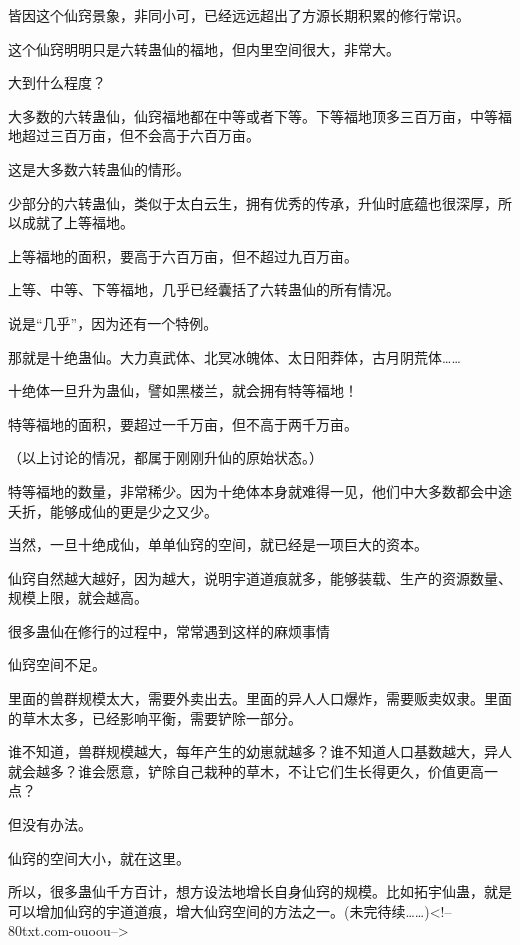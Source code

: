 \begin{this_body}
皆因这个仙窍景象，非同小可，已经远远超出了方源长期积累的修行常识。

这个仙窍明明只是六转蛊仙的福地，但内里空间很大，非常大。

大到什么程度？

大多数的六转蛊仙，仙窍福地都在中等或者下等。下等福地顶多三百万亩，中等福地超过三百万亩，但不会高于六百万亩。

这是大多数六转蛊仙的情形。

少部分的六转蛊仙，类似于太白云生，拥有优秀的传承，升仙时底蕴也很深厚，所以成就了上等福地。

上等福地的面积，要高于六百万亩，但不超过九百万亩。

上等、中等、下等福地，几乎已经囊括了六转蛊仙的所有情况。

说是“几乎”，因为还有一个特例。

那就是十绝蛊仙。大力真武体、北冥冰魄体、太日阳莽体，古月阴荒体……

十绝体一旦升为蛊仙，譬如黑楼兰，就会拥有特等福地！

特等福地的面积，要超过一千万亩，但不高于两千万亩。

（以上讨论的情况，都属于刚刚升仙的原始状态。）

特等福地的数量，非常稀少。因为十绝体本身就难得一见，他们中大多数都会中途夭折，能够成仙的更是少之又少。

当然，一旦十绝成仙，单单仙窍的空间，就已经是一项巨大的资本。

仙窍自然越大越好，因为越大，说明宇道道痕就多，能够装载、生产的资源数量、规模上限，就会越高。

很多蛊仙在修行的过程中，常常遇到这样的麻烦事情

仙窍空间不足。

里面的兽群规模太大，需要外卖出去。里面的异人人口爆炸，需要贩卖奴隶。里面的草木太多，已经影响平衡，需要铲除一部分。

谁不知道，兽群规模越大，每年产生的幼崽就越多？谁不知道人口基数越大，异人就会越多？谁会愿意，铲除自己栽种的草木，不让它们生长得更久，价值更高一点？

但没有办法。

仙窍的空间大小，就在这里。

所以，很多蛊仙千方百计，想方设法地增长自身仙窍的规模。比如拓宇仙蛊，就是可以增加仙窍的宇道道痕，增大仙窍空间的方法之一。(未完待续……)<!--80txt.com-ouoou-->

\end{this_body}

